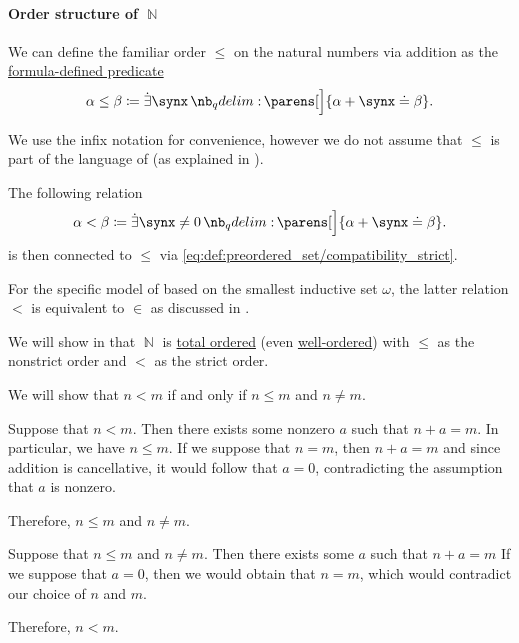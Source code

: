 \paragraph{Order structure of \( \BbbN \)}

\begin{definition}\label{def:natural_numbers_ordering}
  We can define the familiar order \( \leq \) on the natural numbers via addition as the \hyperref[con:formula_defined_predicate]{formula-defined predicate}
  \begin{equation}\label{eq:def:natural_numbers_ordering/predicate}
    \alpha \leq \beta \coloneqq \qexists \synx \parens[\Big]{ \alpha + \synx \syneq \beta }.
  \end{equation}

  We use the infix notation for convenience, however we do not assume that \( \leq \) is part of the language of  (as explained in ).

  The following relation
  \begin{equation}\label{eq:def:natural_numbers_ordering/strict_predicate}
    \alpha < \beta \coloneqq \qexists {\synx \neq 0} \parens[\Big]{ \alpha + \synx \syneq \beta }.
  \end{equation}
  is then connected to \( \leq \) via \eqref{eq:def:preordered_set/compatibility_strict}.
\end{definition}
\begin{comments}
  \item For the specific model of  based on the smallest inductive set \( \omega \), the latter relation \( < \) is equivalent to \( \in \) as discussed in .
  \item We will show in  that \( \BbbN \) is \hyperref[def:totally_ordered_set]{total ordered} (even \hyperref[def:well_ordered_set]{well-ordered}) with \( \leq \) as the nonstrict order and \( < \) as the strict order.
\end{comments}
\begin{defproof}
  We will show that \( n < m \) if and only if \( n \leq m \) and \( n \neq m \).

  \SufficiencySubProof Suppose that \( n < m \). Then there exists some nonzero \( a \) such that \( n + a = m \). In particular, we have \( n \leq m \). If we suppose that \( n = m \), then \( n + a = m \) and since addition is cancellative, it would follow that \( a = 0 \), contradicting the assumption that \( a \) is nonzero.

  Therefore, \( n \leq m \) and \( n \neq m \).

  \NecessitySubProof Suppose that \( n \leq m \) and \( n \neq m \). Then there exists some \( a \) such that \( n + a = m \) If we suppose that \( a = 0 \), then we would obtain that \( n = m \), which would contradict our choice of \( n \) and \( m \).

  Therefore, \( n < m \).
\end{defproof}

